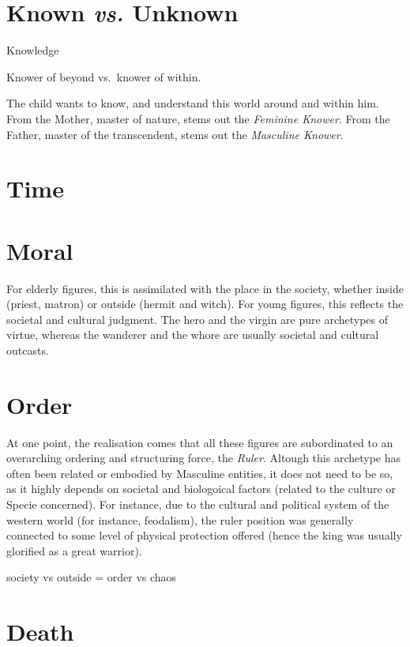 \documentclass[
]{book}
\begin{document}
\hypertarget{known-vs.-unknown}{%
\section{\texorpdfstring{Known \emph{vs.} Unknown}{Known vs. Unknown}}\label{known-vs.-unknown}}

Knowledge

Knower of beyond vs.~knower of within.

The child wants to know, and understand this world around and within him. From the Mother, master of nature, stems out the \emph{Feminine Knower}. From the Father, master of the transcendent, stems out the \emph{Masculine Knower}.

\hypertarget{time}{%
\section{Time}\label{time}}

\hypertarget{moral}{%
\section{Moral}\label{moral}}

For elderly figures, this is assimilated with the place in the society, whether inside (priest, matron) or outside (hermit and witch). For young figures, this reflects the societal and cultural judgment. The hero and the virgin are pure archetypes of virtue, whereas the wanderer and the whore are usually societal and cultural outcasts.

\hypertarget{order}{%
\section{Order}\label{order}}

At one point, the realisation comes that all these figures are subordinated to an overarching ordering and structuring force, the \emph{Ruler}. Altough this archetype has often been related or embodied by Masculine entities, it does not need to be so, as it highly depends on societal and biologoical factors (related to the culture or Specie concerned). For instance, due to the cultural and political system of the western world (for instance, feodalism), the ruler position was generally connected to some level of physical protection offered (hence the king was usually glorified as a great warrior).

society vs outside = order vs chaos

\hypertarget{death}{%
\section{Death}\label{death}}
\end{document}
